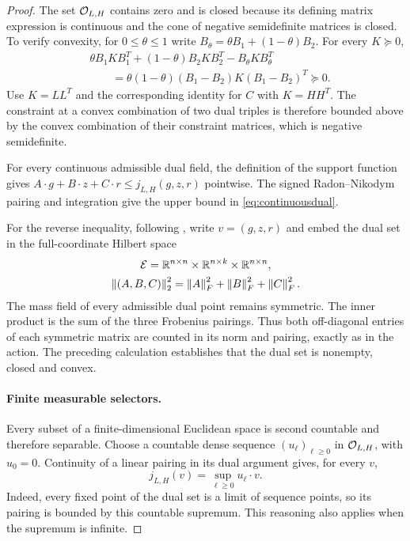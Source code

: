 \begin{proof}
The set $\mathcal O_{L,H}$ contains zero and is closed because its defining
matrix expression is continuous and the cone of negative semidefinite
matrices is closed. To verify convexity, for $0\le\theta\le1$ write
$B_\theta=\theta B_1+(1-\theta)B_2$. For every $K\succeq0$,
\[
 \begin{aligned}
 &\theta B_1KB_1^T+(1-\theta)B_2KB_2^T-B_\theta KB_\theta^T\\
 &\qquad=\theta(1-\theta)(B_1-B_2)K(B_1-B_2)^T\succeq0.
 \end{aligned}
\]
Use $K=LL^T$ and the corresponding identity for $C$ with $K=HH^T$.
The constraint at a convex combination of two dual triples is therefore
bounded above by the convex combination of their constraint matrices,
which is negative semidefinite.

For every continuous admissible dual field, the definition of the support
function gives $A\cdot g+B\cdot z+C\cdot r\le j_{L,H}(g,z,r)$ pointwise.
The signed Radon--Nikodym pairing and integration give the upper bound in
\eqref{eq:continuousdual}.

For the reverse inequality, following \cite[Appendix A]{LiZou}, write
$v=(g,z,r)$ and embed the dual set in the full-coordinate Hilbert space
\[
 \begin{gathered}
 \mathcal E=\mathbb R^{n\times n}\times\mathbb R^{n\times k}\times\mathbb R^{n\times n},\\
 \left\lVert (A,B,C)\right\rVert_2^2=\left\lVert A\right\rVert_F^2+\left\lVert B\right\rVert_F^2+\left\lVert C\right\rVert_F^2.
 \end{gathered}
\]
The mass field of every admissible dual point remains symmetric.
The inner product is the sum of the three Frobenius pairings. Thus both
off-diagonal entries of each symmetric matrix are counted in its norm
and pairing, exactly as in the action. The preceding calculation establishes that the dual set is nonempty,
closed and convex.

\paragraph{Finite measurable selectors.}
Every subset of a finite-dimensional Euclidean space is second countable
and therefore separable.
Choose a countable dense sequence $(u_\ell)_{\ell\ge0}$ in
$\mathcal O_{L,H}$, with $u_0=0$. Continuity of a linear pairing in its dual
argument gives, for every $v$,
\[
 j_{L,H}(v)=\sup_{\ell\ge0}u_\ell\cdot v.
\]
Indeed, every fixed point of the dual set is a limit of sequence points,
so its pairing is bounded by this countable supremum. This reasoning
also applies when the supremum is infinite.


\end{proof}
